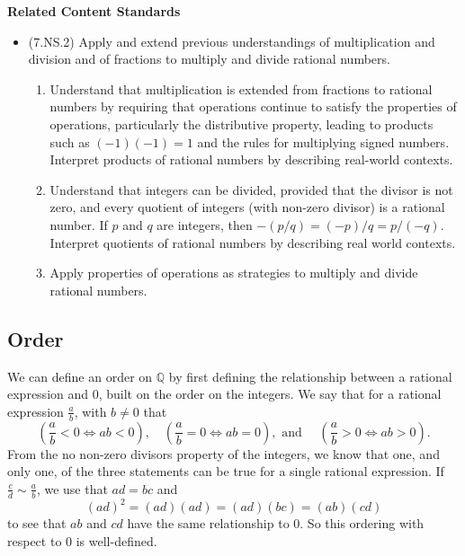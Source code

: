 \documentclass[
]{book}
\providecommand{\tightlist}{%
  \setlength{\itemsep}{0pt}\setlength{\parskip}{0pt}}
\newenvironment{standards}{}{}
\theoremstyle{definition}
\theoremstyle{definition}
\theoremstyle{definition}
\theoremstyle{definition}
\theoremstyle{remark}
\begin{document}
\begin{standards}

\begin{center}
\textbf{Related Content Standards}

\end{center}

\begin{itemize}
\tightlist
\item
  (7.NS.2) Apply and extend previous understandings of multiplication and division and of fractions to multiply and divide rational numbers.

  \begin{enumerate}
  \def\labelenumi{\alph{enumi}.}
  \tightlist
  \item
    Understand that multiplication is extended from fractions to rational numbers by requiring that operations continue to satisfy the properties of operations, particularly the distributive property, leading to products such as \((-1)(-1) = 1\) and the rules for multiplying signed numbers. Interpret products of rational numbers by describing real-world contexts.
  \item
    Understand that integers can be divided, provided that the divisor is not zero, and every quotient of integers (with non-zero divisor) is a rational number. If \(p\) and \(q\) are integers, then \(-(p/q) = (-p)/q = p/(-q)\). Interpret quotients of rational numbers by describing real world contexts.
  \item
    Apply properties of operations as strategies to multiply and divide rational numbers.
  \end{enumerate}
\end{itemize}

\end{standards}

\hypertarget{order}{%
\subsection{Order}\label{order}}

We can define an order on \(\mathbb{Q}\) by first defining the relationship between a rational expression and \(0\), built on the order on the integers. We say that for a rational expression \(\frac{a}{b}\), with \(b\neq 0\) that
\[\left(\frac{a}{b} < 0 \Leftrightarrow ab<0\right),  \quad \left(\frac{a}{b}=0 \Leftrightarrow ab=0\right), \mbox{ and } \quad \left(\frac{a}{b} >0 \Leftrightarrow ab >0\right).\]
From the no non-zero divisors property of the integers, we know that one, and only one, of the three statements can be true for a single rational expression. If \(\frac{c}{d}\sim \frac{a}{b}\), we use that \(ad=bc\) and \[(ad)^2 = (ad)(ad) = (ad)(bc) = (ab)(cd)\] to see that \(ab\) and \(cd\) have the same relationship to \(0\). So this ordering with respect to \(0\) is well-defined.
\end{document}
